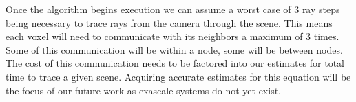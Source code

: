 Once the algorithm begins execution we can assume a worst case of 3 ray steps being necessary to trace rays from the camera through the scene.  This means each voxel will need to communicate with its neighbors a maximum of 3 times. Some of this communication will be within a node, some will be between nodes.  The cost of this communication needs to be factored into our estimates for total time to trace a given scene.  Acquiring accurate estimates for this equation will be the focus of our future work as exascale systems do not yet exist.  

